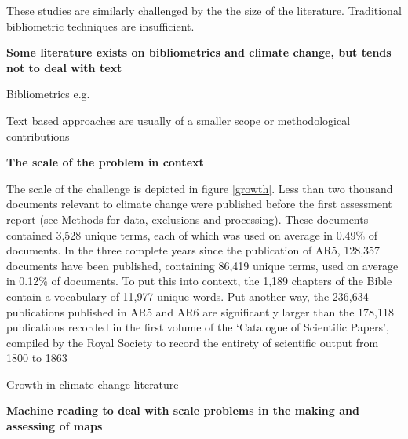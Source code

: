 \documentclass{article}
\begin{document}
\begin{linenumbers}
These studies are similarly challenged by the the size of the literature. Traditional bibliometric techniques are insufficient.

\bigskip
\noindent\textbf{Some literature exists on bibliometrics and climate change, but tends not to deal with text}

Bibliometrics e.g. \citep{Haunschild2016} \citep{Grieneisen2011}

Text based approaches are usually of a smaller scope \citep{Grubert2016} or methodological contributions \citep{Blei2003}


\bigskip
\noindent\textbf{The scale of the problem in context}

The scale of the challenge is depicted in figure \ref{growth}. Less than two thousand documents relevant to climate change were published before the first assessment report (see Methods for data, exclusions and processing). These documents contained 3,528 unique terms, each of which was used on average in 0.49\% of documents. In the three complete years since the publication of AR5, 128,357 documents have been published, containing 86,419 unique terms, used on average in 0.12\% of documents. To put this into context, the 1,189 chapters of the Bible contain a vocabulary of 11,977 unique words. Put another way, the 236,634 publications published in AR5 and AR6 are significantly larger than the 178,118 publications recorded in the first volume of the `Catalogue of Scientific Papers', compiled by the Royal Society to record the entirety of scientific output from 1800 to 1863 \citep{Csiszar2017}


\begin{table}
	\scriptsize
	
	\caption{Growth in climate change literature}
\end{table}



\bigskip
\noindent\textbf{Machine reading to deal with scale problems in the making and assessing of maps}



\end{linenumbers}
\end{document}
